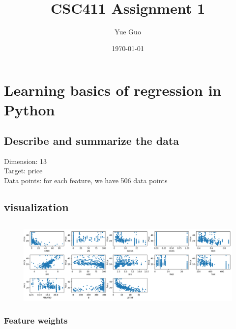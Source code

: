 \documentclass[letterpaper]{article}
\date{\today}
\title{CSC411 Assignment 1}
\author{Yue Guo}
\begin{document}
\maketitle


\section{Learning basics of regression in Python }

\subsection{Describe and summarize the data}
Dimension: 13\\
Target: price\\
Data points: for each feature, we have 506 data points

\subsection{visualization}
\subsection{}
\begin{figure}[H]
\centering
\includegraphics[width=1\textwidth]{Figure_1.png}
\caption{\label{fig:q1}}
\end{figure}


\subsubsection{Feature weights}
\end{document}
